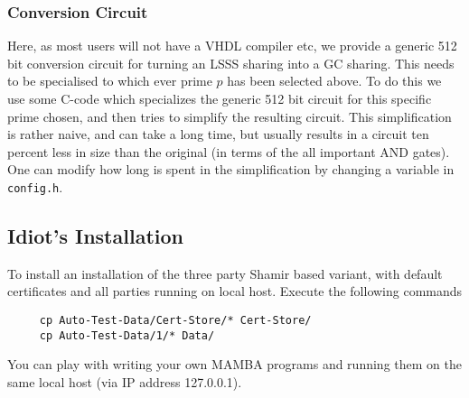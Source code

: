 \subsubsection{Conversion Circuit}
Here, as most users will not have a VHDL compiler etc, we provide
a generic 512 bit conversion circuit for turning an LSSS sharing
into a GC sharing.
This needs to be specialised to which ever prime $p$ has been selected above.
To do this we use some C-code  which specializes the generic 512
bit circuit for this specific prime chosen, and then tries
to simplify the resulting circuit. This simplification is rather
naive, and can take a long time, but usually results in a circuit ten percent
less in size than the original (in terms of the all important AND gates).
One can modify how long is spent in the simplification by 
changing a variable in \verb+config.h+.

\subsection{Idiot's Installation}
\label{sec:idiot}
To install an installation of the three party Shamir based
variant, with default certificates and all parties running
on local host. 
Execute the following commands
\begin{verbatim}
     cp Auto-Test-Data/Cert-Store/* Cert-Store/
     cp Auto-Test-Data/1/* Data/
\end{verbatim}
You can play with writing your own MAMBA programs and 
running them on the same local host (via IP address
127.0.0.1).

